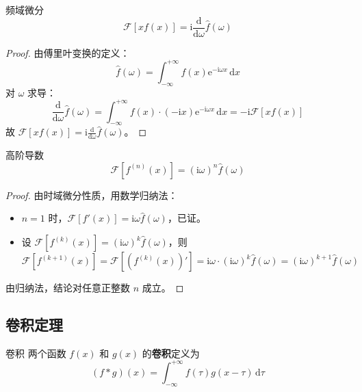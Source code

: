 \begin{dingli}{}{频域微分}
\begin{equation}
    \mathcal{F}[xf(x)] = \mathrm{i}\frac{\mathrm{d}}{\mathrm{d}\omega}\hat{f}(\omega)
\end{equation}
\end{dingli}

\begin{proof}
由傅里叶变换的定义：
\begin{equation}
    \hat{f}(\omega) = \int_{-\infty}^{+\infty} f(x)\mathrm{e}^{-\mathrm{i}\omega x}\,\mathrm{d}x
\end{equation}
对 $\omega$ 求导：
\begin{equation}
    \frac{\mathrm{d}}{\mathrm{d}\omega}\hat{f}(\omega) = \int_{-\infty}^{+\infty} f(x) \cdot (-\mathrm{i}x) \mathrm{e}^{-\mathrm{i}\omega x}\,\mathrm{d}x = -\mathrm{i}\mathcal{F}[xf(x)]
\end{equation}
故 $\mathcal{F}[xf(x)] = \mathrm{i}\frac{\mathrm{d}}{\mathrm{d}\omega}\hat{f}(\omega)$。
\end{proof}
\begin{dingli}{}{高阶导数}
\begin{equation}
    \mathcal{F}[f^{(n)}(x)] = (\mathrm{i}\omega)^n\hat{f}(\omega)
\end{equation}
\end{dingli}

\begin{proof}
由时域微分性质，用数学归纳法：
\begin{itemize}
    \item $n=1$ 时，$\mathcal{F}[f'(x)] = \mathrm{i}\omega\hat{f}(\omega)$，已证。
    \item 设 $\mathcal{F}[f^{(k)}(x)] = (\mathrm{i}\omega)^k\hat{f}(\omega)$，则
    \begin{equation}
        \mathcal{F}[f^{(k+1)}(x)] = \mathcal{F}[(f^{(k)}(x))'] = \mathrm{i}\omega \cdot (\mathrm{i}\omega)^k\hat{f}(\omega) = (\mathrm{i}\omega)^{k+1}\hat{f}(\omega)
    \end{equation}
\end{itemize}
由归纳法，结论对任意正整数 $n$ 成立。
\end{proof}
\subsection{卷积定理}

\begin{dingliyi}{}{卷积}
两个函数 $f(x)$ 和 $g(x)$ 的\textbf{卷积}定义为
\begin{equation}
    (f * g)(x) = \int_{-\infty}^{+\infty} f(\tau)g(x - \tau)\,\mathrm{d}\tau
\end{equation}
\end{dingliyi}

